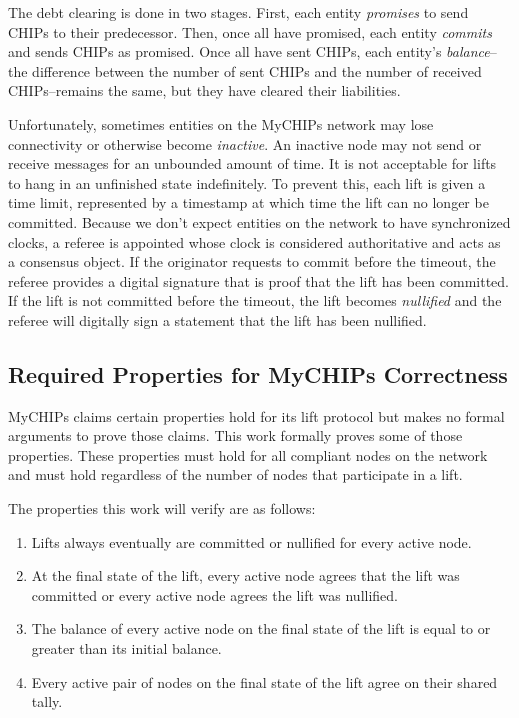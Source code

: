 \documentclass[runningheads]{llncs}
\begin{document}
The debt clearing is done in two stages. First, each entity \emph{promises} to send CHIPs to their predecessor. Then, once all have promised, each entity \emph{commits} and sends CHIPs as promised. Once all have sent CHIPs, each entity's \emph{balance}--the difference between the number of sent CHIPs and the number of received CHIPs--remains the same, but they have cleared their liabilities. 

Unfortunately, sometimes entities on the MyCHIPs network may lose connectivity or otherwise become \emph{inactive}. An inactive node may not send or receive messages for an unbounded amount of time. It is not acceptable for lifts to hang in an unfinished state indefinitely. To prevent this, each lift is given a time limit, represented by a timestamp at which time the lift can no longer be committed. Because we don't expect entities on the network to have synchronized clocks, a referee is appointed whose clock is considered authoritative and acts as a consensus object. If the originator requests to commit before the timeout, the referee provides a digital signature that is proof that the lift has been committed. If the lift is not committed before the timeout, the lift becomes \emph{nullified} and the referee will digitally sign a statement that the lift has been nullified.

\subsection{Required Properties for MyCHIPs Correctness}\label{sec:requiredProperties}

MyCHIPs claims certain properties hold for its lift protocol but makes no formal arguments to prove those claims. This work formally proves some of those properties. These properties must hold for all compliant nodes on the network and must hold regardless of the number of nodes that participate in a lift. 

The properties this work will verify are as follows:

\begin{enumerate}
\item Lifts always eventually are committed or nullified for every active node. 
\item At the final state of the lift, every active node agrees that the lift was committed or every active node agrees the lift was nullified. 
\item The balance of every active node on the final state of the lift is equal to or greater than its initial balance.
\item Every active pair of nodes on the final state of the lift agree on their shared tally.
\end{enumerate}
\end{document}
